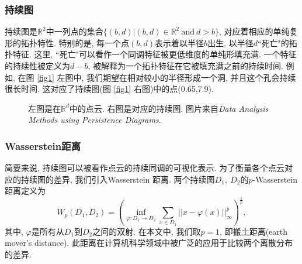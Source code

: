 \documentclass[12pt]{ctexart}
\begin{document}
\subsubsection{持续图}


持续图是$\mathbb{R}^{2}$中一列点的集合$\{(b,d)|(b,d)\in \mathbb{R}^{2}\ \mathrm{and}\  d>b\}$, 对应着相应的单纯复形的拓扑特性\cite{ref22,ref26}. 特别的是, 每一个点$(b,d)$表示着以半径$b$出生, 以半径$d$``死亡"的拓扑特征. 这里, ``死亡"可以看作一个同调特征被更低维度的单纯形填充满. 一个特征的持续性被定义为$d-b$, 被解释为一个拓扑特征在它被填充满之前的持续时间. 例如, 在图 \ref{fig1} 左图中, 我们期望在相对较小的半径形成一个洞, 并且这个孔会持续很长时间. 这对应了持续图(图 \ref{fig1} 右图)中的点(0.65,7.9). 

\begin{figure}[H]
  \centering
  \hspace{0.5in} 
  \caption{左图是在$\mathbb{R}^{d}$中的点云. 右图是对应的持续图. 图片来自\emph{Data Analysis Methods using Persistence Diagrams}\cite{ref26}.}
  \label{fig1}
  \label{fig:twopicture} 
\end{figure}
\subsubsection{Wasserstein距离}
简要来说, 持续图可以被看作点云的持续同调的可视化表示\cite{ref22}. 为了衡量各个点云对应的持续图的差异,  我们引入Wasserstein 距离. 两个持续图$D_{1},\ D_{2}$的$p$-Wasserstein距离定义为
$$W_{p}(D_{1},D_{2})=\left(\inf_{\varphi:D_{1}\rightarrow D_{2}}\sum_{x\in D_{1}}||x-\varphi(x)||^{p}_{\infty}\right)^{\frac{1}{p}},$$
其中, $\varphi$是所有从$D_{1}$到$D_{2}$之间的双射. 在本文中, 我们取$p=1$, 即搬土距离(earth mover's distance). 此距离在计算机科学领域中被广泛的应用于比较两个离散分布的差异.
\end{document}
